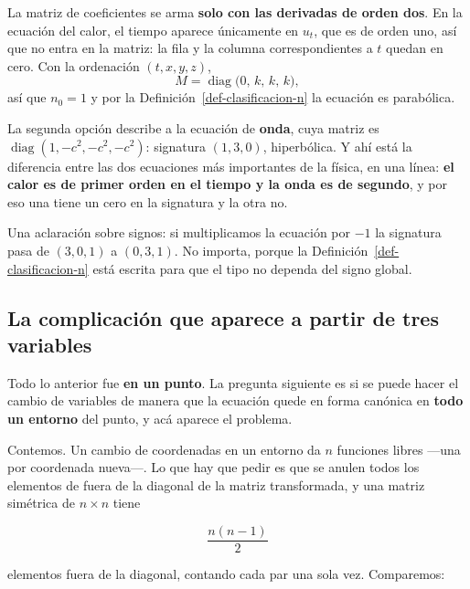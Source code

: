 \documentclass[
  spanish,
  a4paper,
]{scrbook}
\theoremstyle{definition}
\theoremstyle{plain}
\theoremstyle{definition}
\theoremstyle{plain}
\theoremstyle{definition}
\theoremstyle{remark}
\begin{document}
La matriz de coeficientes se arma \textbf{solo con las derivadas de
orden dos}. En la ecuación del calor, el tiempo aparece únicamente en
\(u_t\), que es de orden uno, así que no entra en la matriz: la fila y
la columna correspondientes a \(t\) quedan en cero. Con la ordenación
\((t,x,y,z)\), \[M = \operatorname{diag}\big(0,\,k,\,k,\,k\big),\] así
que \(n_0 = 1\) y por la Definición~\ref{def-clasificacion-n} la
ecuación es parabólica.

La segunda opción describe a la ecuación de \textbf{onda}, cuya matriz
es \(\operatorname{diag}(1,-c^2,-c^2,-c^2)\): signatura \((1,3,0)\),
hiperbólica. Y ahí está la diferencia entre las dos ecuaciones más
importantes de la física, en una línea: \textbf{el calor es de primer
orden en el tiempo y la onda es de segundo}, y por eso una tiene un cero
en la signatura y la otra no.

Una aclaración sobre signos: si multiplicamos la ecuación por \(-1\) la
signatura pasa de \((3,0,1)\) a \((0,3,1)\). No importa, porque la
Definición~\ref{def-clasificacion-n} está escrita para que el tipo no
dependa del signo global.

\subsection{La complicación que aparece a partir de tres
variables}\label{sec-obstruccion}

Todo lo anterior fue \textbf{en un punto}. La pregunta siguiente es si
se puede hacer el cambio de variables de manera que la ecuación quede en
forma canónica en \textbf{todo un entorno} del punto, y acá aparece el
problema.

Contemos. Un cambio de coordenadas en un entorno da \(n\) funciones
libres ---una por coordenada nueva---. Lo que hay que pedir es que se
anulen todos los elementos de fuera de la diagonal de la matriz
transformada, y una matriz simétrica de \(n\times n\) tiene

\[
\frac{n(n-1)}{2}
\]

elementos fuera de la diagonal, contando cada par una sola vez.
Comparemos:
\end{document}
